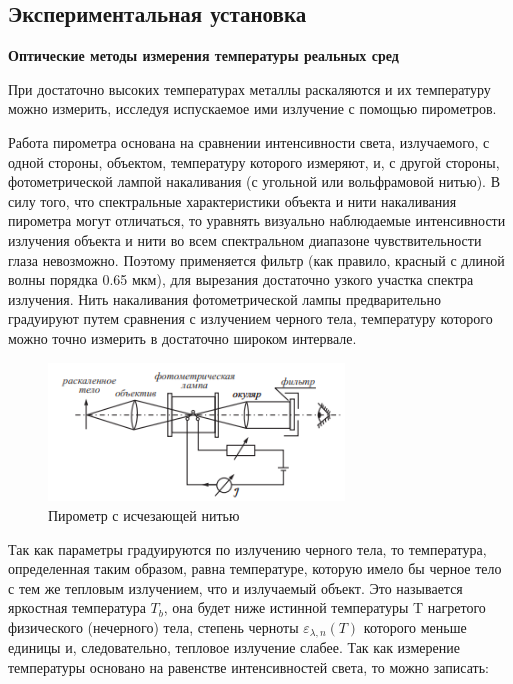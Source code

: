 \documentclass[12pt,a4paper]{article}
\begin{document}
\subsection{Экспериментальная установка}

\par \textbf{Оптические методы измерения температуры реальных сред}
\par При достаточно высоких температурах металлы раскаляются и их температуру можно измерить, исследуя испускаемое ими излучение с помощью пирометров.

\par 
Работа пирометра основана на сравнении интенсивности света, излучаемого, с одной стороны, объектом, температуру которого измеряют, и, с другой стороны, фотометрической лампой накаливания
(с угольной или вольфрамовой нитью). В силу того, что спектральные характеристики объекта и нити накаливания пирометра могут отличаться, то уравнять визуально наблюдаемые интенсивности излучения объекта и нити во всем спектральном диапазоне чувствительности глаза невозможно. Поэтому применяется фильтр (как правило, красный с длиной волны порядка 0.65 мкм), для
вырезания достаточно узкого участка спектра излучения. Нить накаливания фотометрической лампы предварительно градуируют путем сравнения с излучением черного тела, температуру которого можно точно измерить в достаточно широком интервале.

\begin{figure}[h!]
	\begin{center}
		\includegraphics[width = 0.7\textwidth]{MSS-1-3}
		\caption{Пирометр с исчезающей нитью}
	\end{center}
\end{figure}

\par Так как параметры градуируются по излучению черного тела, то температура, определенная таким образом, равна температуре, которую имело бы черное тело с тем же тепловым излучением, что и излучаемый объект. Это называется яркостная температура $T_b$, она будет ниже истинной температуры T нагретого физического (нечерного) тела, степень черноты $\varepsilon_{\lambda ,n}(T)$ которого меньше единицы и, следовательно, тепловое излучение слабее. Так как измерение температуры основано на равенстве интенсивностей света, то можно записать:
\end{document}
